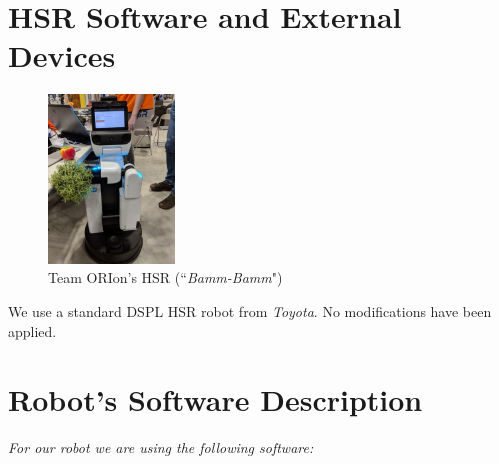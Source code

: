 \section*{HSR Software and External Devices}
\label{sec:annex-DSPL}


\setlength\intextsep{0pt}
\begin{figure}
	\centering
	\includegraphics[width=0.3\textwidth]{images/hsr.jpg}
	\caption{Team ORIon's HSR (``\textit{Bamm-Bamm}")}
	\label{fig:bamm-bamm}
\end{figure}

We use a standard DSPL HSR robot from \textit{Toyota}. No modifications have been applied.

\section*{Robot's Software Description}

\textit{For our robot we are using the following software:}

